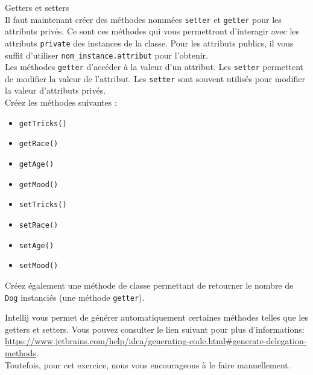 \begin{Exercice}[10 minutes] Getters et setters\\
    Il faut maintenant créer des méthodes nommées \lstinline{setter} et \lstinline{getter} pour les attributs privés. Ce sont ces méthodes qui vous permettront d'interagir avec les attributs \lstinline{private} des instances de la classe. Pour les attributs publics, il vous suffit d'utiliser \lstinline{nom_instance.attribut} pour l'obtenir. \\
    
    Les méthodes \lstinline{getter} d'accéder à la valeur d'un attribut. Les \lstinline{setter} permettent de modifier la valeur de l'attribut. Les \lstinline{setter} sont souvent utilisés pour modifier la valeur d'attributs privés. \\
    
    Créez les méthodes suivantes :
    \begin{itemize}
    \item \lstinline{getTricks()}
    \item \lstinline{getRace()}
    \item \lstinline{getAge()}
    \item \lstinline{getMood()}
    \item \lstinline{setTricks()}
    \item \lstinline{setRace()}
    \item \lstinline{setAge()}
    \item \lstinline{setMood()}
    \end{itemize}
    
    Créez également une méthode de classe permettant de retourner le nombre de \lstinline{Dog} instanciés (une méthode \lstinline{getter}).
   	
\begin{conseil}
    Intellij vous permet de générer automatiquement certaines méthodes telles que les getters et setters. Vous pouvez consulter le lien suivant pour plus d'informations: \url{https://www.jetbrains.com/help/idea/generating-code.html\#generate-delegation-methods}.
    \\
    Toutefois, pour cet exercice, nous vous encourageons à le faire manuellement.
\end{conseil}
    
\begin{solution}
	
\end{solution}
\end{Exercice}

